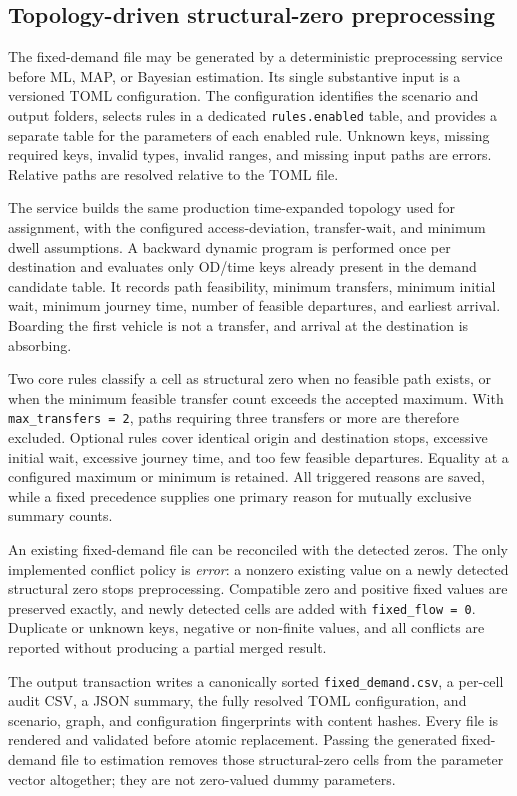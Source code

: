 \subsection{Topology-driven structural-zero preprocessing}

The fixed-demand file may be generated by a deterministic preprocessing service
before ML, MAP, or Bayesian estimation.  Its single substantive input is a
versioned TOML configuration.  The configuration identifies the scenario and
output folders, selects rules in a dedicated \texttt{rules.enabled} table, and
provides a separate table for the parameters of each enabled rule.  Unknown
keys, missing required keys, invalid types, invalid ranges, and missing input
paths are errors.  Relative paths are resolved relative to the TOML file.

The service builds the same production time-expanded topology used for
assignment, with the configured access-deviation, transfer-wait, and minimum
dwell assumptions.  A backward dynamic program is performed once per
destination and evaluates only OD/time keys already present in the demand
candidate table.  It records path feasibility, minimum transfers, minimum
initial wait, minimum journey time, number of feasible departures, and earliest
arrival.  Boarding the first vehicle is not a transfer, and arrival at the
destination is absorbing.

Two core rules classify a cell as structural zero when no feasible path exists,
or when the minimum feasible transfer count exceeds the accepted maximum.  With
\texttt{max\_transfers = 2}, paths requiring three transfers or more are
therefore excluded.  Optional rules cover identical origin and destination
stops, excessive initial wait, excessive journey time, and too few feasible
departures.  Equality at a configured maximum or minimum is retained.  All
triggered reasons are saved, while a fixed precedence supplies one primary
reason for mutually exclusive summary counts.

An existing fixed-demand file can be reconciled with the detected zeros.  The
only implemented conflict policy is \emph{error}: a nonzero existing value on a
newly detected structural zero stops preprocessing.  Compatible zero and
positive fixed values are preserved exactly, and newly detected cells are added
with \texttt{fixed\_flow = 0}.  Duplicate or unknown keys, negative or
non-finite values, and all conflicts are reported without producing a partial
merged result.

The output transaction writes a canonically sorted \texttt{fixed\_demand.csv},
a per-cell audit CSV, a JSON summary, the fully resolved TOML configuration, and
scenario, graph, and configuration fingerprints with content hashes.  Every
file is rendered and validated before atomic replacement.  Passing the
generated fixed-demand file to estimation removes those structural-zero cells
from the parameter vector altogether; they are not zero-valued dummy
parameters.

